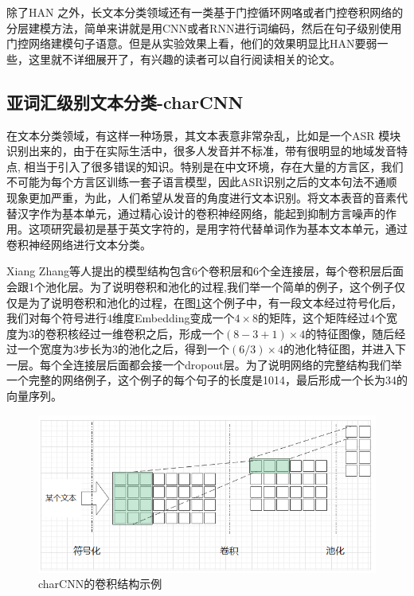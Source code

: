 \documentclass[twoside,a4paper,12pt]{book}%
\begin{document}
除了\gls{HAN} 之外，长文本分类领域还有一类基于门控循环网咯或者门控卷积网络的分层建模方法，简单来讲就是用CNN或者RNN进行词编码，然后在句子级别使用门控网络建模句子语意。但是从实验效果上看，他们的效果明显比\gls{HAN}要弱一些，这里就不详细展开了，有兴趣的读者可以自行阅读相关的论文。

\subsection{亚词汇级别文本分类-charCNN}
在文本分类领域，有这样一种场景，其文本表意非常杂乱，比如是一个\gls{ASR} 模块识别出来的，由于在实际生活中，很多人发音并不标准，带有很明显的地域发音特点, 相当于引入了很多错误的知识。特别是在中文环境，存在大量的方言区，我们不可能为每个方言区训练一套子语言模型，因此\gls{ASR}识别之后的文本句法不通顺现象更加严重，为此，人们希望从发音的角度进行文本识别。将文本表音的音素代替汉字作为基本单元，通过精心设计的卷积神经网络，能起到抑制方言噪声的作用。这项研究最初是基于英文字符的，是用字符代替单词作为基本文本单元，通过卷积神经网络进行文本分类。

Xiang Zhang等人提出的模型结构包含6个卷积层和6个全连接层，每个卷积层后面会跟1个池化层。为了说明卷积和池化的过程,我们举一个简单的例子，这个例子仅仅是为了说明卷积和池化的过程，在图\ref{fig:charcnn1}这个例子中，有一段文本经过符号化后，我们对每个符号进行$4$维度Embedding变成一个$4 \times 8$的矩阵，这个矩阵经过$4$个宽度为$3$的卷积核经过一维卷积之后，形成一个$(8-3+1) \times 4$的特征图像，随后经过一个宽度为$3$步长为$3$的池化之后，得到一个$(6/3)\times 4$的池化特征图，并进入下一层。每个全连接层后面都会接一个dropout层。为了说明网络的完整结构我们举一个完整的网络例子，这个例子的每个句子的长度是1014，最后形成一个长为34的向量序列。
\begin{figure}[h]
	\begin{center}
	\includegraphics[width=5.6in]{figures/charcnn1.png}
	\caption{charCNN的卷积结构示例}
	\label{fig:charcnn1}
\end{center}
\end{figure}
\end{document}
